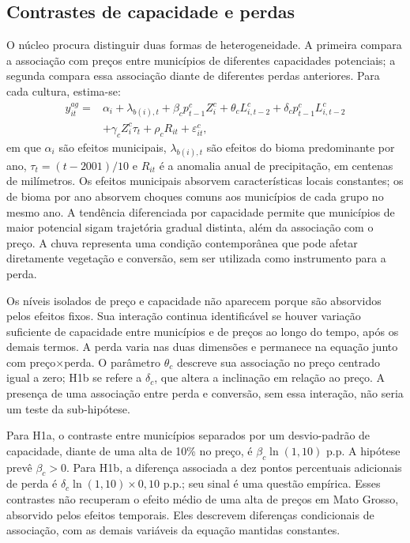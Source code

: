 \subsection{Contrastes de capacidade e perdas}

O núcleo procura distinguir duas formas de heterogeneidade. A primeira compara a associação com preços entre municípios de diferentes capacidades potenciais; a segunda compara essa associação diante de diferentes perdas anteriores. Para cada cultura, estima-se:
\begin{equation}
\begin{split}
y^{ag}_{it}={}&\alpha_i+\lambda_{b(i),t}
 +\beta_c p^c_{t-1}Z^c_i
 +\theta_c L^c_{i,t-2}
 +\delta_c p^c_{t-1}L^c_{i,t-2}\\
 &+\gamma_c Z^c_i\tau_t+\rho_c R_{it}+\varepsilon^c_{it},
\end{split}
\label{eq:nucleo}
\end{equation}
em que $\alpha_i$ são efeitos municipais, $\lambda_{b(i),t}$ são efeitos do bioma predominante por ano, $\tau_t=(t-2001)/10$ e $R_{it}$ é a anomalia anual de precipitação, em centenas de milímetros. Os efeitos municipais absorvem características locais constantes; os de bioma por ano absorvem choques comuns aos municípios de cada grupo no mesmo ano. A tendência diferenciada por capacidade permite que municípios de maior potencial sigam trajetória gradual distinta, além da associação com o preço. A chuva representa uma condição contemporânea que pode afetar diretamente vegetação e conversão, sem ser utilizada como instrumento para a perda.

Os níveis isolados de preço e capacidade não aparecem porque são absorvidos pelos efeitos fixos. Sua interação continua identificável se houver variação suficiente de capacidade entre municípios e de preços ao longo do tempo, após os demais termos. A perda varia nas duas dimensões e permanece na equação junto com preço×perda. O parâmetro $\theta_c$ descreve sua associação no preço centrado igual a zero; H1b se refere a $\delta_c$, que altera a inclinação em relação ao preço. A presença de uma associação entre perda e conversão, sem essa interação, não seria um teste da sub-hipótese.

Para H1a, o contraste entre municípios separados por um desvio-padrão de capacidade, diante de uma alta de 10\% no preço, é $\beta_c\ln(1,10)$ p.p. A hipótese prevê $\beta_c>0$. Para H1b, a diferença associada a dez pontos percentuais adicionais de perda é $\delta_c\ln(1,10)\times0,10$ p.p.; seu sinal é uma questão empírica. Esses contrastes não recuperam o efeito médio de uma alta de preços em Mato Grosso, absorvido pelos efeitos temporais. Eles descrevem diferenças condicionais de associação, com as demais variáveis da equação mantidas constantes.

